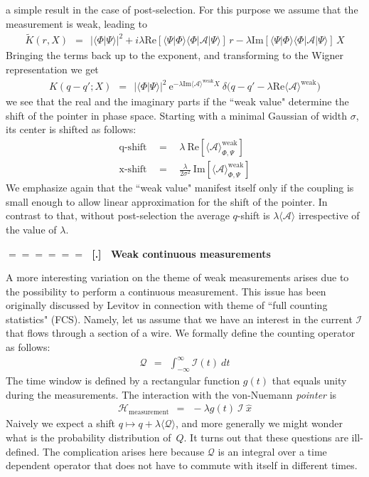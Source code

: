 \documentclass[onecolumn,fleqn]{revtex4}
\newcommand{\im}{\mathrm{Im}}
\newcommand{\re}{\mathrm{Re}}
\newcommand{\eexp}{\mathrm{e}^}
\newcommand{\tbox}[1]{\text{#1}}
\newcommand{\beq}{\begin{eqnarray}}
\newcommand{\eeq}{\end{eqnarray}}
\renewcommand{\thesubsection}{\arabic{subsection}}
\renewcommand{\thesubsubsection}{\arabic{subsubsection}}
\newcommand{\sheadC}[1]
{
\addtocounter{subsubsection}{1}
\vspace{5mm}
{\Large\bf $=\!=\!=\!=\!=\!=\;$ [\thesubsection.\thesubsubsection] \ #1}  
\nopagebreak
\phantomsection
}
\begin{document}
a simple result in the case of post-selection. 
For this purpose we assume that the measurement is weak, leading to 
\beq
\tilde{K}(r,X) \ \ = \ \  
|\langle \Phi|\Psi \rangle|^2 
+ i \lambda \re\left[ \langle \Psi|\Phi \rangle \langle \Phi| \mathcal{A} |\Psi \rangle   \right] \, r  
- \lambda \im\left[  \langle \Psi|\Phi \rangle \langle \Phi| \mathcal{A} |\Psi \rangle \right] \, X
\eeq
Bringing the terms back up to the exponent, 
and transforming to the Wigner representation we get
\beq
K(q{-}q';X) \ \ = \ \ |\langle \Phi|\Psi \rangle|^2 
\ \eexp{-\lambda \im\langle \mathcal{A} \rangle^{\tbox{weak}} X}
\ \delta\Big(q-q'-\lambda \re\langle \mathcal{A} \rangle^{\tbox{weak}} \Big)
\eeq
we see that the real and the imaginary parts if the ``weak value" 
determine the shift of the pointer in phase space. 
Starting with a minimal Gaussian of width $\sigma$, 
its center is shifted as follows:
\beq
\mbox{q-shift} \ \ &=& \ \ \lambda \ \re\left[\langle \mathcal{A} \rangle_{\Phi,\Psi}^{\tbox{weak}}\right]
\\
\mbox{x-shift} \  \ &=& \ \ \frac{\lambda}{2\sigma^2} \ \im\left[\langle \mathcal{A} \rangle_{\Phi,\Psi}^{\tbox{weak}}\right]
\eeq
We emphasize again that the ``weak value" manifest itself
only if the coupling is small enough to allow linear approximation 
for the shift of the pointer. In contrast to that, 
without post-selection  the average $q$-shift is ${\lambda \langle \mathcal{A} \rangle}$ 
irrespective of the value of $\lambda$.


\sheadC{Weak continuous measurements}

A more interesting variation on the theme of weak measurements  
arises due to the possibility to perform a continuous measurement.
This issue has been originally discussed by Levitov in connection 
with theme of ``full counting statistics" (FCS). 
Namely, let us assume that we have an interest in the current $\mathcal{I}$ that flows 
through a section of a wire. We formally define the counting 
operator as follows:  
\beq
\mathcal{Q} \ \ = \ \ \int_{-\infty}^{\infty} \mathcal{I}(t) \ dt
\eeq
The time window is defined by a rectangular function $g(t)$  that 
equals unity during the measurements. The interaction 
with the von-Nuemann {\em pointer} is  
\beq
\mathcal{H}_{\tbox{measurement}} \ \ = \ \ -\lambda g(t) \ \mathcal{I} \ \hat{x}
\eeq
Naively we expect a shift ${q \mapsto q + \lambda \langle \mathcal{Q} \rangle}$, 
and more generally we might wonder what is the probability distribution of~$Q$.
It turns out that these questions are ill-defined. 
The complication arises here because $\mathcal{Q}$ is an integral 
over a time dependent operator that does not have to commute 
with itself in different times. 
\end{document}
